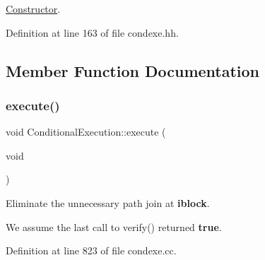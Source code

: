 \mbox{\hyperlink{class_constructor}{Constructor}}. 



Definition at line 163 of file condexe.\+hh.



\subsection{Member Function Documentation}
\mbox{\label{class_conditional_execution_afc3956000baa5c9338bdb728ba3034b3}} 
\subsubsection{\texorpdfstring{execute()}{execute()}}
{\footnotesize\ttfamily void Conditional\+Execution\+::execute (\begin{DoxyParamCaption}\item[{void}]{ }\end{DoxyParamCaption})}



Eliminate the unnecessary path join at {\bfseries{iblock}}. 

We assume the last call to verify() returned {\bfseries{true}}. 

Definition at line 823 of file condexe.\+cc.

